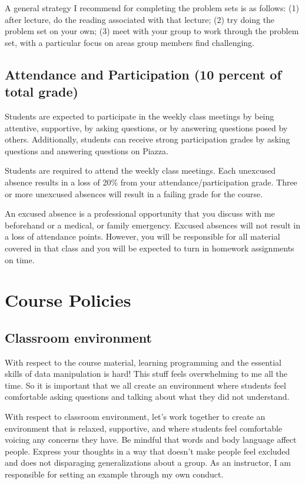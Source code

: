 \documentclass[11pt,]{article}
\begin{document}
A general strategy I recommend for completing the problem sets is as
follows: (1) after lecture, do the reading associated with that lecture;
(2) try doing the problem set on your own; (3) meet with your group to
work through the problem set, with a particular focus on areas group
members find challenging.

\subsection{Attendance and Participation (10 percent of total
grade)}\label{attendance-and-participation-10-percent-of-total-grade}

Students are expected to participate in the weekly class meetings by
being attentive, supportive, by asking questions, or by answering
questions posed by others. Additionally, students can receive strong
participation grades by asking questions and answering questions on
Piazza.

Students are required to attend the weekly class meetings. Each
unexcused absence results in a loss of 20\% from your
attendance/participation grade. Three or more unexcused absences will
result in a failing grade for the course.

An excused absence is a professional opportunity that you discuss with
me beforehand or a medical, or family emergency. Excused absences will
not result in a loss of attendance points. However, you will be
responsible for all material covered in that class and you will be
expected to turn in homework assignments on time.

\section{Course Policies}\label{course-policies}

\subsection{Classroom environment}\label{classroom-environment}

With respect to the course material, learning programming and the
essential skills of data manipulation is hard! This stuff feels
overwhelming to me all the time. So it is important that we all create
an environment where students feel comfortable asking questions and
talking about what they did not understand.

With respect to classroom environment, let's work together to create an
environment that is relaxed, supportive, and where students feel
comfortable voicing any concerns they have. Be mindful that words and
body language affect people. Express your thoughts in a way that doesn't
make people feel excluded and does not disparaging generalizations about
a group. As an instructor, I am responsible for setting an example
through my own conduct.
\end{document}
